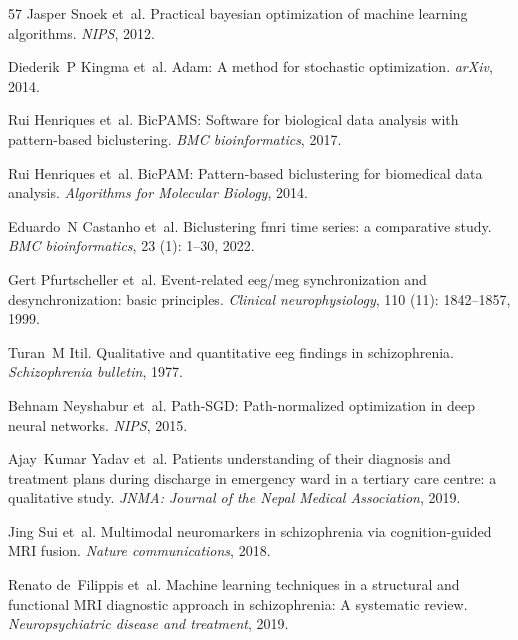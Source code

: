 \documentclass{article}
\begin{document}
\begin{thebibliography}{57}
Jasper Snoek et~al.
\newblock Practical bayesian optimization of machine learning algorithms.
\newblock \emph{NIPS}, 2012.

Diederik~P Kingma et~al.
\newblock Adam: {A} method for stochastic optimization.
\newblock \emph{arXiv}, 2014.

Rui Henriques et~al.
\newblock Bic{PAMS}: {S}oftware for biological data analysis with pattern-based biclustering.
\newblock \emph{BMC bioinformatics}, 2017.

Rui Henriques et~al.
\newblock Bic{PAM}: {P}attern-based biclustering for biomedical data analysis.
\newblock \emph{Algorithms for Molecular Biology}, 2014.

Eduardo~N Castanho et~al.
\newblock Biclustering fmri time series: a comparative study.
\newblock \emph{BMC bioinformatics}, 23 (1): 1--30, 2022.

Gert Pfurtscheller et~al.
\newblock Event-related eeg/meg synchronization and desynchronization: basic principles.
\newblock \emph{Clinical neurophysiology}, 110 (11): 1842--1857, 1999.

Turan~M Itil.
\newblock Qualitative and quantitative eeg findings in schizophrenia.
\newblock \emph{Schizophrenia bulletin}, 1977.

Behnam Neyshabur et~al.
\newblock Path-{SGD}: {P}ath-normalized optimization in deep neural networks.
\newblock \emph{NIPS}, 2015.

Ajay~Kumar Yadav et~al.
\newblock Patients understanding of their diagnosis and treatment plans during discharge in emergency ward in a tertiary care centre: a qualitative study.
\newblock \emph{JNMA: Journal of the Nepal Medical Association}, 2019.

Jing Sui et~al.
\newblock Multimodal neuromarkers in schizophrenia via cognition-guided {MRI} fusion.
\newblock \emph{Nature communications}, 2018.

Renato de~Filippis et~al.
\newblock Machine learning techniques in a structural and functional {MRI} diagnostic approach in schizophrenia: {A} systematic review.
\newblock \emph{Neuropsychiatric disease and treatment}, 2019.


\end{thebibliography}
\end{document}

